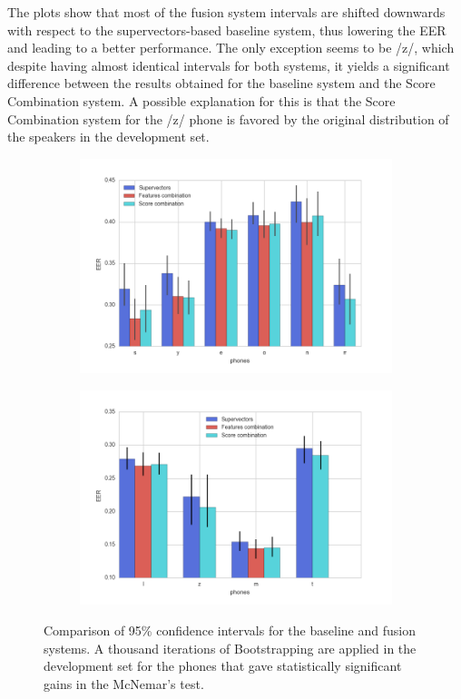 The plots show that most of the fusion system intervals are shifted downwards with
respect to the supervectors-based baseline system, thus lowering the EER and leading
to a better performance.
The only exception seems to be /z/, which
despite having almost identical intervals for both systems,
it yields a significant difference
between the results obtained for the baseline system and the Score Combination system.
A possible explanation for this is that the Score Combination system for the /z/
phone is favored by the original distribution of the speakers in the development set.

\begin{figure}[H]
  \centering
  \begin{subfigure}{.47\textwidth}
    \centering
    \captionsetup{width=.95\linewidth}
    \includegraphics[width=1.08\linewidth, height=0.225\textheight]{files/figures/results/bootstrapping/bootstrapping_dev_2}
  \end{subfigure}
  \begin{subfigure}{.47\textwidth}
    \centering
    \captionsetup{width=.95\linewidth}
    \includegraphics[width=.72\linewidth, height=0.225\textheight]{files/figures/results/bootstrapping/bootstrapping_dev_1}
  \end{subfigure}
  \caption{Comparison of 95\% confidence intervals for the baseline and fusion systems.
  A thousand iterations of Bootstrapping are applied
  in the development set for the phones that gave statistically significant gains in the
  McNemar's test.}
  \label{fig:bootstrappingDev}
\end{figure}

